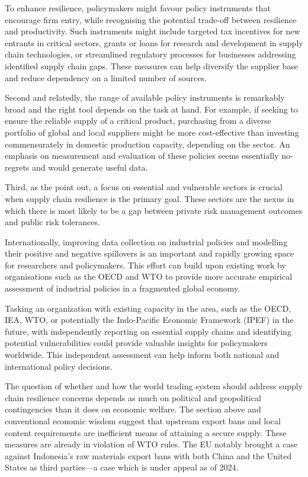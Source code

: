 \documentclass{article}
\begin{document}
To enhance resilience, policymakers might favour policy instruments that encourage firm entry, while recognising the potential trade-off between resilience and productivity. Such instruments might include targeted tax incentives for new entrants in critical sectors, grants or loans for research and development in supply chain technologies, or streamlined regulatory processes for businesses addressing identified supply chain gaps. These measures can help diversify the supplier base and reduce dependency on a limited number of sources.

Second and relatedly, the range of available policy instruments is remarkably broad and the right tool depends on the task at hand. For example, if seeking to ensure the reliable supply of a critical product, purchasing from a diverse portfolio of global and local suppliers might be more cost-effective than investing commensurately in domestic production capacity, depending on the sector. An emphasis on measurement and evaluation of these policies seems essentially no-regrets and would generate useful data.

Third, as the \textcite{productivity_commission_vulnerable_2021} point out, a focus on essential and vulnerable sectors is crucial when supply chain resilience is the primary goal. These sectors are the nexus in which there is most likely to be a gap between private risk management outcomes and public risk tolerances.

Internationally, improving data collection on industrial policies and modelling their positive and negative spillovers is an important and rapidly growing space for researchers and policymakers. This effort can build upon existing work by organisations such as the OECD and WTO to provide more accurate empirical assessment of industrial policies in a fragmented global economy.

Tasking an organization with existing capacity in the area, such as the OECD, IEA, WTO, or potentially the Indo-Pacific Economic Framework (IPEF) in the future, with independently reporting on essential supply chains and identifying potential vulnerabilities could provide valuable insights for policymakers worldwide. This independent assessment can help inform both national and international policy decisions.

The question of whether and how the world trading system should address supply chain resilience concerns depends as much on political and geopolitical contingencies than it does on economic welfare. The section above and conventional economic wisdom suggest that upstream export bans and local content requirements are inefficient means of attaining a secure supply. These measures are already in violation of WTO rules. The EU notably brought a case against Indonesia's raw materials export bans with both China and the United States as third parties---a case which is under appeal as of 2024.
\end{document}
